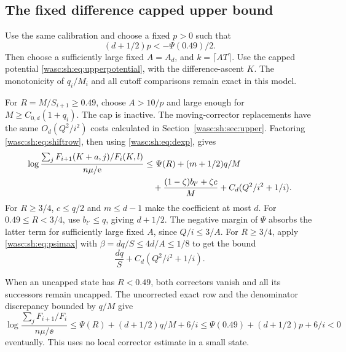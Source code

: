 \documentclass[11pt,a4paper]{article}
\theoremstyle{remark}\newtheorem{remark}[theorem]{Remark}
\numberwithin{equation}{section}
\begin{document}
\subsection{The fixed difference capped upper bound}
Use the same calibration and choose a fixed $p>0$ such that
\[
(d+1/2)p< -\Psi(0.49)/2.
\]
Then choose a sufficiently large fixed $A=A_d$, and $k=\lceil AT\rceil$. Use the capped potential \eqref{wasc:sh:eq:upperpotential}, with the difference-ascent $K$. The monotonicity of $q_i/M_i$ and all cutoff comparisons remain exact in this model.

For $R=M/S_{i+1}\ge0.49$, choose $A>10/p$ and large enough for $M\ge C_{0,d}(1+q_i)$. The cap is inactive. The moving-corrector replacements have the same $O_d(Q^2/i^2)$ costs calculated in Section~\ref{wasc:sh:sec:upper}. Factoring \eqref{wasc:sh:eq:shiftrow}, then using \eqref{wasc:sh:eq:dexp}, gives
\begin{align}\label{wasc:sh:eq:dregularfull}
\log\frac{\sum_jF_{i+1}(K+a,j)/F_i(K,l)}{n\mu/\mathrm e}
&\le\Psi(R)+(m+1/2)q/M\notag\\
&\quad+\frac{(1-\zeta)b_{l'}+\zeta c}{M}
+C_d(Q^2/i^2+1/i).
\end{align}
For $R\ge3/4$, $c\le q/2$ and $m\le d-1$ make the coefficient at most $d$. For $0.49\le R<3/4$, use $b_{l'}\le q$, giving $d+1/2$. The negative margin of $\Psi$ absorbs the latter term for sufficiently large fixed $A$, since $Q/i\le3/A$. For $R\ge3/4$, apply \eqref{wasc:sh:eq:psimax} with $\beta=dq/S\le4d/A\le1/8$ to get the bound
\begin{equation}\label{wasc:sh:eq:dregular}
\frac{dq}{S}+C_d(Q^2/i^2+1/i).
\end{equation}

When an uncapped state has $R<0.49$, both correctors vanish and all its successors remain uncapped. The uncorrected exact row and the denominator discrepancy bounded by $q/M$ give
\begin{equation}\label{wasc:sh:eq:dsmall}
\log\frac{\sum_jF_{i+1}/F_i}{n\mu/\ee}
\le\Psi(R)+(d+1/2)q/M+6/i
\le\Psi(0.49)+(d+1/2)p+6/i<0
\end{equation}
eventually. This uses no local corrector estimate in a small state.
\end{document}
